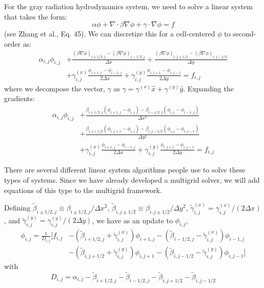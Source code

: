 For the gray radiation hydrodynamics system, we need to solve a
linear system that takes the form:
\begin{equation}
  \alpha \phi + \nabla \cdot \beta \nabla \phi + \gamma \cdot \nabla \phi = f
\end{equation}
(see Zhang et al., Eq. 45). 
We can discretize this for a cell-centered $\phi$ to second-order as:
\begin{align}
  \alpha_{i,j} \phi_{i,j} &+
  \frac{(\beta \nabla \phi)_{i+1/2,j} -
        (\beta \nabla \phi)_{i-1/2,j}}{\Delta x} +
  \frac{(\beta \nabla \phi)_{i,j+1/2} -
        (\beta \nabla \phi)_{i,j-1/2}}{\Delta y} \nonumber \\
  &+
  \gamma^{(x)}_{i,j} \frac{\phi_{i+1,j} - \phi_{i-1,j}}{2\Delta x} +
  \gamma^{(y)}_{i,j} \frac{\phi_{i,j+1} - \phi_{i,j-1}}{2\Delta y} = f_{i,j}
\end{align}
where we decompose the vector, $\gamma$ as $\gamma = \gamma^{(x)}\hat{x} + \gamma^{(y)}\hat{y}$.  Expanding the gradients:
\begin{align}
\label{eq:general_L}
\alpha_{i,j} \phi_{i,j} &+
  \frac{\beta_{i+1/2,j} (\phi_{i+1,j} - \phi_{i,j}) -
        \beta_{i-1/2,j} (\phi_{i,j} - \phi_{i-1,j})}{\Delta x^2} \nonumber \\
 &+
  \frac{\beta_{i,j+1/2} (\phi_{i,j+1} - \phi_{i,j}) -
        \beta_{i,j-1/2} (\phi_{i,j} - \phi_{i,j-1})}{\Delta y^2} \nonumber \\
  &+
  \gamma^{(x)}_{i,j} \frac{\phi_{i+1,j} - \phi_{i-1,j}}{2\Delta x} +
  \gamma^{(y)}_{i,j} \frac{\phi_{i,j+1} - \phi_{i,j-1}}{2\Delta y} = f_{i,j}
\end{align}

There are several different linear system algorithms people use to solve
these types of systems.  Since we have already developed a multigrid
solver, we will add equations of this type to the multigrid framework.

Defining $\tilde{\beta}_{i\pm1/2,j} \equiv \beta_{i\pm1/2,j}/\Delta x^2$,
$\tilde{\beta}_{i,j\pm1/2} \equiv \beta_{i,j\pm1/2}/\Delta y^2$,
$\tilde{\gamma}^{(x)}_{i,j} = \gamma^{(x)}_{i,j}/(2\Delta x)$,
and $\tilde{\gamma}^{(y)}_{i,j} = \gamma^{(y)}_{i,j}/(2\Delta y)$, we have
as an update to $\phi_{i,j}$,
\begin{align}
\label{eq:general_mg_smooth}
\phi_{i,j} = \frac{1}{D_{i,j}} \bigg [ f_{i,j}
  &-(\tilde{\beta}_{i+1/2,j} + \tilde{\gamma}^{(x)}_{i,j}) \phi_{i+1,j}
   -(\tilde{\beta}_{i-1/2,j} - \tilde{\gamma}^{(x)}_{i,j}) \phi_{i-1,j}
  \nonumber \\
  &-(\tilde{\beta}_{i,j+1/2} + \tilde{\gamma}^{(y)}_{i,j}) \phi_{i,j+1}
   -(\tilde{\beta}_{i,j-1/2} - \tilde{\gamma}^{(y)}_{i,j}) \phi_{i,j-1}
   \bigg ]
\end{align}
with
\begin{equation}
D_{i,j} = \alpha_{i,j} - \tilde{\beta}_{i+1/2,j} - \tilde{\beta}_{i-1/2,j}
                       - \tilde{\beta}_{i,j+1/2} - \tilde{\beta}_{i,j-1/2}
\end{equation}            

